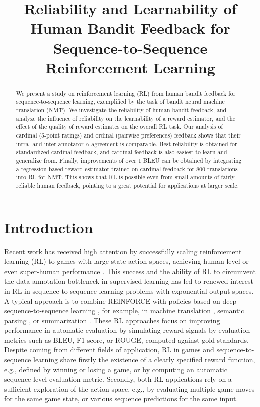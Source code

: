 \title{Reliability and Learnability of Human Bandit Feedback for Sequence-to-Sequence Reinforcement Learning}

\begin{abstract}
We present a study on reinforcement learning (RL) from human bandit feedback for sequence-to-sequence learning, exemplified by the task of bandit neural machine translation (NMT). We investigate the reliability of human bandit feedback, and analyze the influence of reliability on the learnability of a reward estimator, and the effect of the quality of reward estimates on the overall RL task. Our analysis of cardinal (5-point ratings) and ordinal (pairwise preferences) feedback shows that their intra- and inter-annotator $\alpha$-agreement is comparable. Best reliability is obtained for standardized cardinal feedback, and cardinal feedback is also easiest to learn and generalize from. Finally, improvements of over 1 BLEU can be obtained by integrating a regression-based reward estimator trained on cardinal feedback for 800 translations into RL for NMT. This shows that RL is possible even from small amounts of fairly reliable human feedback, pointing to a great potential for applications at larger scale.
\end{abstract}

\section{Introduction}
\label{sec:intro}

Recent work has received high attention by successfully scaling reinforcement learning (RL) to games with large state-action spaces, achieving human-level \cite{MnihETAL:15} or even super-human performance \cite{SilverETAL:16}. This success and the ability of RL to circumvent the data annotation bottleneck in supervised learning has led to renewed interest in RL in sequence-to-sequence learning problems with exponential output spaces. A typical approach is to combine REINFORCE \cite{Williams:92} with policies based on deep sequence-to-sequence learning \cite{BahdanauETAL:15}, for example, in machine translation \cite{BahdanauETAL:17}, semantic parsing \cite{LiangETAL:17}, or summarization \cite{PaulusETAL:17}. These RL approaches focus on improving performance in automatic evaluation by simulating reward signals by evaluation metrics such as BLEU, F1-score, or ROUGE, computed against gold standards. Despite coming from different fields of application, RL in games and sequence-to-sequence learning share firstly the existence of a clearly specified reward function, e.g., defined by winning or losing a game, or by computing an automatic sequence-level evaluation metric. Secondly, both RL applications rely on a sufficient exploration of the action space, e.g., by evaluating multiple game moves for the same game state, or various sequence predictions for the same input.

